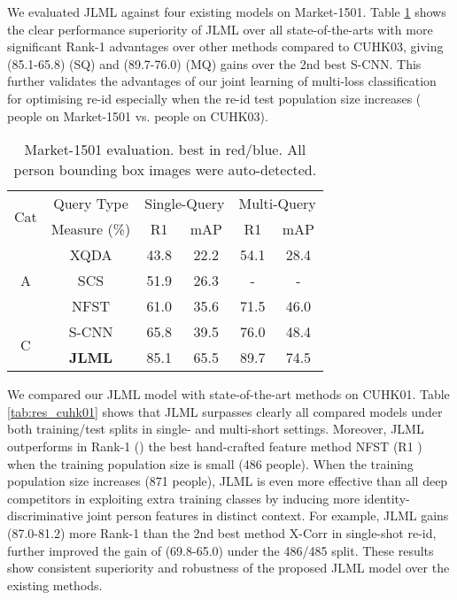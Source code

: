\documentclass{article}
\begin{document}
\vspace{0.1cm}
We evaluated JLML against four existing models on Market-1501.
Table \ref{tab:res_market} shows the clear performance superiority of JLML
over all state-of-the-arts with more significant Rank-1 advantages
over other methods compared to CUHK03, giving (85.1-65.8) (SQ) and
(89.7-76.0) (MQ) gains over the 2nd best S-CNN. This further validates the advantages of our joint learning of
multi-loss classification for optimising re-id especially when the
re-id test population size increases ( people on Market-1501
vs.  people on CUHK03).

\begin{table} [!h]
	\centering
	\footnotesize
\renewcommand{\arraystretch}{1}
	\setlength{\tabcolsep}{0.3 cm}
	\vspace{-.5cm}
	\caption{\footnotesize
Market-1501 evaluation.  best in red/blue.
		All person bounding box images were auto-detected.
	}
	\vskip 0pt \begin{tabular}{|c||c|cc|cc|}
		\hline
\multirow{2}{*}{Cat}
		& Query Type &  \multicolumn{2}{c|}{Single-Query} &\multicolumn{2}{c|}{Multi-Query} \\ \cline{2-6}
		& Measure (\%)    
		& R1 & mAP & R1 & mAP  \\ \hline \hline
		\multirow{3}{*}{A}
		& XQDA &  43.8 &  22.2  &  54.1 &  28.4\\   & SCS &  51.9 &  26.3 &  - &  -  \\  & NFST & 61.0 & 35.6  &  71.5 &  46.0  \\ 
		\hline
\multirow{2}{*}{C}
		& S-CNN &  \color{blue}  65.8 &  \color{blue}  39.5  &  \color{blue}  76.0 &  \color{blue}  48.4  \\ 
& {\bf JLML} &  \color{red} {85.1} &  \color{red} {65.5}  &   \color{red} {89.7} &   \color{red} {74.5}  \\ 
		\hline
	\end{tabular}\label{tab:res_market}
	\vspace{-.3cm}
\end{table}


\vspace{0.1cm}
We compared our JLML model with  state-of-the-art methods on CUHK01.
Table \ref{tab:res_cuhk01} shows that 
JLML surpasses clearly all compared models under both training/test splits in single- and multi-short settings.
Moreover, JLML outperforms in Rank-1 () the best hand-crafted
feature method NFST (R1 ) when the training population size is
small (486 people). When the training population size increases (871 people),
JLML is even more effective than all deep competitors in exploiting
extra training classes by inducing more identity-discriminative joint person features in distinct context.
For example, JLML gains (87.0-81.2) more Rank-1 than the 2nd
best method X-Corr in single-shot re-id, further improved the gain of
(69.8-65.0) under the 486/485 split.
These results show consistent superiority and robustness of the proposed JLML model
over the existing methods.
\end{document}
